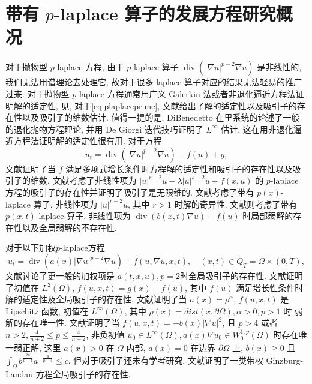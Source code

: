 \documentclass[oneside,longtitle]{LZUthesis}
\numberwithin{equation}{chapter}
\newcommand*\abs[1]{\lvert#1\rvert}
\DeclareMathOperator{\Div}{div}
\begin{document}
\section{带有 $p$-laplace 算子的发展方程研究概况}
对于抛物型 $p$-laplace 方程, 由于 $p$-laplace 算子 $\Div(\abs{\nabla u}^{p-2}\nabla u)$ 是非线性的, 我们无法用谱理论去处理它, 故对于很多 laplace 算子对应的结果无法轻易的推广过来.
对于抛物型 $p$-laplace 方程通常用广义 Galerkin 法或者非退化逼近方程法证明解的适定性, 见\citep{babinAttractorsEvolutionEquations1992a},
对于\cref{eq:plaplaceprime}, 文献\citep{efendievAttractorsDegenerateParabolic2013b}给出了解的适定性以及吸引子的存在性以及吸引子的维数估计.
值得一提的是, DiBenedetto 在\citep{dibenedettoDegenerateParabolicEquations1993a}里系统的论述了一般的退化抛物方程理论,
并用 De Giorgi 迭代技巧证明了 $L^\infty$ 估计, 这在用非退化逼近方程法证明解的适定性很有用.
对于方程
\begin{equation}\label{eq:plaplaceprime}
	u_t = \Div(\abs{\nabla u}^{p - 2}\nabla u) - f(u) + g,
\end{equation}
文献\citep{liuAsymptoticRegularityPLaplacian2010}证明了当 $f$ 满足多项式增长条件时方程解的适定性和吸引子的存在性以及吸引子的维数.
文献\citep{zhongZ2IndexGlobal2010}考虑了非线性项为 $\abs{u}^{r-2}u - \lambda\abs{u}^{s-2}u + f(x, u)$ 的 $p$-laplace 方程的吸引子的存在性并证明了吸引子是无限维的.
文献\citep{guoSingularPhenomenaSolutions2015}考虑了带有 $p(x)$-laplace 算子, 非线性项为 $\abs{u}^{r-2}u$, 其中 $r > 1$ 时解的奇异性.
文献\citep{gaoExistenceUniquenessNonexistence2016}则考虑了带有 $p(x, t)$-laplace 算子, 非线性项为 $\Div(b(x, t)\nabla u) + f(u)$ 时局部弱解的存在性以及全局弱解的不存在性.

对于以下加权$p$-laplace方程
\begin{equation*}
	u_t = \Div(a(x)\abs{\nabla u}^{p-2}\nabla u) + f(u, \nabla u, x, t), \quad (x, t) \in Q_T = \Omega \times (0, T),
\end{equation*}
文献\citep{constantinGlobalSolutionsQuasilinear2002}讨论了更一般的加权项是 $a(t, x, u), p = 2$时全局吸引子的存在性.
文献\citep{maGlobalAttractorsWeighted2012a}证明了初值在 $L^2(\Omega)$, $f(u, x, t) = g(x) - f(u)$, 其中 $f(u)$ 满足增长性条件时解的适定性及全局吸引子的存在性.
文献\citep{zhanParabolicEquationRelated2016}证明了当
$a(x) = \rho^\alpha$, $f(u, x, t)$ 是 Lipschitz 函数, 初值在 $L^\infty(\Omega)$, 其中 $\rho(x) = dist(x, \partial \Omega), \alpha > 0, p > 1$ 时
弱解的存在唯一性. 文献\citep{Zhan2019Uniquenessa}证明了当 $f(u, x, t) = -b(x)\abs{\nabla u}^2$,
且 $p > 4$ 或者 $n > 2, \frac{4}{n+2} \leq p \leq \frac{4}{n-2}$,
非负初值 $u_0 \in L^\infty(\Omega), a(x)\nabla u_0 \in W_0^{1, p}(\Omega)$ 时存在唯一弱正解,
这里 $a(x) > 0$ 在 $\Omega$ 内部, $a(x) = 0$ 在边界 $\partial\Omega$ 上,
$b(x) \geq 0$ 且 $\int_{\Omega} b^{\frac{2p}{p-4}}a^{-\frac{4}{p-4}} \leq c$.
但对于吸引子还未有学者研究.
文献\citep{karachaliosConvergenceAttractorsDegenerate2005}证明了一类带权 Ginzburg-Landau 方程全局吸引子的存在性.
\end{document}
